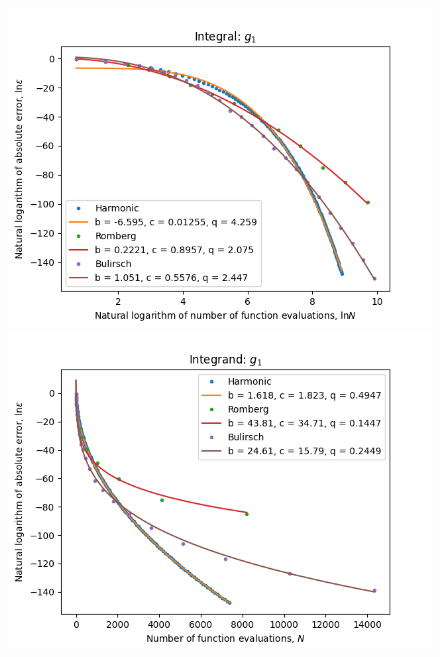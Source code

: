 \begin{figure}[H]
\centering
\begin{minipage}{0.45\textwidth}
\centering
\includegraphics[scale=0.45]{romberg_plots/g_one_hp_log_log_pow_fit_trend.png}
\end{minipage}
\begin{minipage}{0.45\textwidth}
\centering
\includegraphics[scale=0.45]{romberg_plots/g_one_hp_trend.png}
\end{minipage}
\end{figure}

